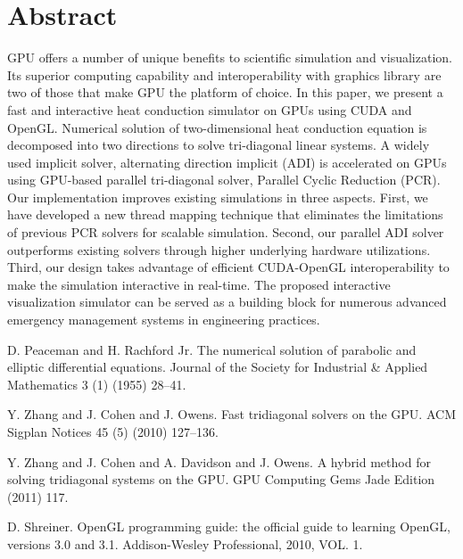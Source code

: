 \documentclass[article, A4, 11pt]{llncs}%
\begin{document}
\section*{Abstract}
GPU offers a number of unique benefits to scientific simulation and visualization. Its superior computing capability and interoperability with graphics library are two of those that make GPU the platform of choice. In this paper, we present a fast and interactive heat conduction simulator on GPUs using CUDA and OpenGL. Numerical solution of two-dimensional heat conduction equation is decomposed into two directions to solve tri-diagonal linear systems. A widely used implicit solver, alternating direction implicit (ADI) is accelerated on GPUs using GPU-based parallel tri-diagonal solver, Parallel Cyclic Reduction (PCR). Our implementation improves existing simulations in three aspects. First, we have developed a new thread mapping technique that eliminates the limitations of previous PCR solvers for scalable simulation. Second, our parallel ADI solver outperforms existing solvers through higher underlying hardware utilizations. Third, our design takes advantage of efficient CUDA-OpenGL interoperability to make the simulation interactive in real-time. The proposed interactive visualization simulator can be served as a building block for numerous advanced emergency management systems in engineering practices.


\begin{thebibliography}{10}
{\sc D. Peaceman and H. Rachford Jr}. {The numerical solution of parabolic and elliptic differential equations}. Journal of the Society for Industrial \& Applied Mathematics 3 (1) (1955) 28–41.

{\sc Y. Zhang and J. Cohen and J. Owens}. {Fast tridiagonal solvers on the GPU}. ACM Sigplan Notices 45 (5) (2010) 127–136.

{\sc Y. Zhang and J. Cohen and A. Davidson and J. Owens}. {A hybrid method for solving tridiagonal systems on the GPU}. GPU Computing Gems Jade Edition (2011) 117.

{\sc D. Shreiner}. {OpenGL programming guide: the official guide to learning OpenGL, versions 3.0 and 3.1}. Addison-Wesley Professional, 2010, VOL. 1.
\end{thebibliography} %
\end{document}
